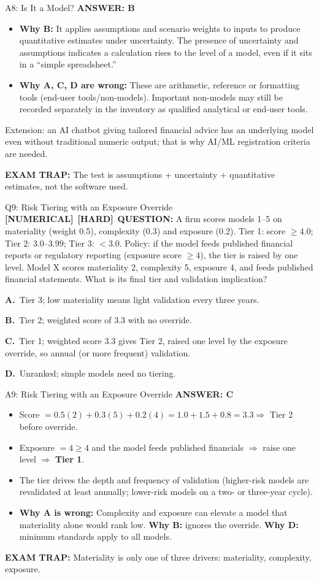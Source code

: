 \documentclass[8pt]{beamer}
\newcommand{\fs}{\fontsize{10}{12}\selectfont}
\newcommand{\opts}[4]{\par\vspace{0.12cm}\noindent\textbf{A.}~#1\par\vspace{0.08cm}\noindent\textbf{B.}~#2\par\vspace{0.08cm}\noindent\textbf{C.}~#3\par\vspace{0.08cm}\noindent\textbf{D.}~#4\par}
\newcommand{\ans}[1]{\textcolor{myblue}{\textbf{ANSWER: #1}}}
\newcommand{\trap}[1]{\textcolor{myred}{\textbf{EXAM TRAP:}} #1}
\newcommand{\numtag}{\textcolor{mypurple}{\textbf{[NUMERICAL]}}}
\newcommand{\hard}{\textcolor{myorange}{\textbf{[HARD]}}}
\begin{document}
\begin{frame}[t]{A8: Is It a Model?}
\fs
\ans{B}
\begin{itemize}
\item \textbf{Why B:} It applies assumptions and scenario weights to inputs to produce quantitative estimates under uncertainty. The presence of uncertainty and assumptions indicates a calculation rises to the level of a model, even if it sits in a ``simple spreadsheet.''
\item \textbf{Why A, C, D are wrong:} These are arithmetic, reference or formatting tools (end-user tools/non-models). Important non-models may still be recorded separately in the inventory as qualified analytical or end-user tools.
\end{itemize}
\textcolor{myblue}{Extension:} an AI chatbot giving tailored financial advice has an underlying model even without traditional numeric output; that is why AI/ML registration criteria are needed.

\trap{The test is \textcolor{myblue}{assumptions + uncertainty + quantitative estimates}, not the software used.}
\end{frame}

\begin{frame}[t]{Q9: Risk Tiering with an Exposure Override}
\fs
\numtag\ \hard\ \textbf{QUESTION:} A firm scores models 1--5 on materiality (weight 0.5), complexity (0.3) and exposure (0.2). Tier 1: score $\ge 4.0$; Tier 2: $3.0$--$3.99$; Tier 3: $<3.0$. Policy: if the model feeds published financial reports or regulatory reporting (exposure score $\ge 4$), the tier is raised by one level. Model X scores materiality 2, complexity 5, exposure 4, and feeds published financial statements. What is its final tier and validation implication?
\opts{Tier 3; low materiality means light validation every three years.}
{Tier 2; weighted score of 3.3 with no override.}
{Tier 1; weighted score 3.3 gives Tier 2, raised one level by the exposure override, so annual (or more frequent) validation.}
{Unranked; simple models need no tiering.}
\end{frame}

\begin{frame}[t]{A9: Risk Tiering with an Exposure Override}
\fs
\ans{C}
\begin{itemize}
\item Score $=0.5(2)+0.3(5)+0.2(4)=1.0+1.5+0.8=\mathbf{3.3}\Rightarrow$ Tier 2 before override.
\item Exposure $=4\ge4$ and the model feeds published financials $\Rightarrow$ raise one level $\Rightarrow$ \textbf{Tier 1}.
\item The tier drives the depth and frequency of validation (higher-risk models are revalidated at least annually; lower-risk models on a two- or three-year cycle).
\item \textbf{Why A is wrong:} Complexity and exposure can elevate a model that materiality alone would rank low. \textbf{Why B:} ignores the override. \textbf{Why D:} minimum standards apply to all models.
\end{itemize}
\trap{Materiality is only \textcolor{myblue}{one} of three drivers: \textcolor{myblue}{materiality, complexity, exposure}.}
\end{frame}
\end{document}
